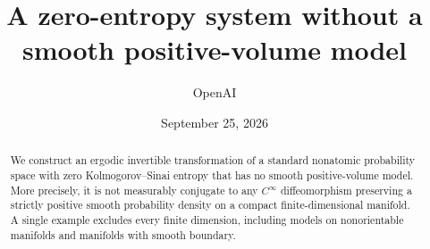 \documentclass[11pt]{article}
\title{A zero-entropy system without a smooth positive-volume model}
\author{OpenAI}
\date{September 25, 2026}
\begin{document}
\maketitle
\begin{abstract}
We construct an ergodic invertible transformation of a standard nonatomic
probability space with zero Kolmogorov--Sinai entropy that has no smooth
positive-volume model. More precisely, it is not measurably conjugate to any
$C^\infty$ diffeomorphism preserving a strictly positive smooth probability
density on a compact finite-dimensional manifold. A single example excludes
every finite dimension, including models on nonorientable manifolds and
manifolds with smooth boundary.
\end{abstract}
\tableofcontents
\clearpage









\end{document}
